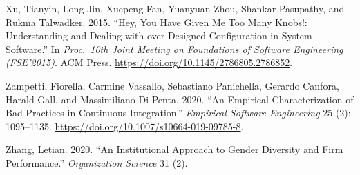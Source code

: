 \documentclass[
]{krantz}
\newlength{\cslhangindent}
\newenvironment{cslreferences}%
  {\setlength{\parindent}{0pt}%
  \everypar{\setlength{\hangindent}{\cslhangindent}}\ignorespaces}%
  {\par}
\begin{document}
\begin{cslreferences}
\leavevmode\hypertarget{ref-Xu2015}{}%
Xu, Tianyin, Long Jin, Xuepeng Fan, Yuanyuan Zhou, Shankar Pasupathy, and Rukma Talwadker. 2015. ``Hey, You Have Given Me Too Many Knobs!: Understanding and Dealing with over-Designed Configuration in System Software.'' In \emph{Proc.~10th Joint Meeting on Foundations of Software Engineering (FSE'2015)}. ACM Press. \url{https://doi.org/10.1145/2786805.2786852}.

\leavevmode\hypertarget{ref-Zamp2020}{}%
Zampetti, Fiorella, Carmine Vassallo, Sebastiano Panichella, Gerardo Canfora, Harald Gall, and Massimiliano Di Penta. 2020. ``An Empirical Characterization of Bad Practices in Continuous Integration.'' \emph{Empirical Software Engineering} 25 (2): 1095--1135. \url{https://doi.org/10.1007/s10664-019-09785-8}.

\leavevmode\hypertarget{ref-Zhan2020}{}%
Zhang, Letian. 2020. ``An Institutional Approach to Gender Diversity and Firm Performance.'' \emph{Organization Science} 31 (2).
\end{cslreferences}

\backmatter
\printindex
\end{document}
